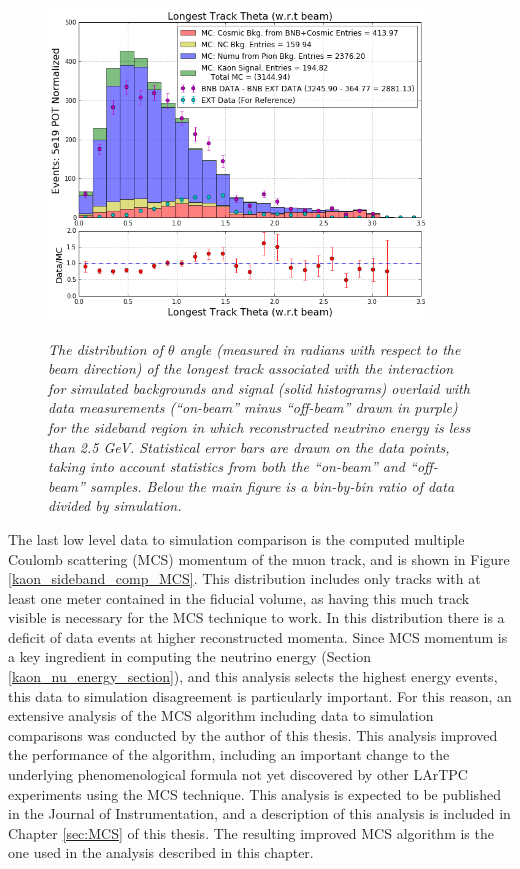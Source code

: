 \begin{figure}[ht!]
\centering
	\includegraphics[width=0.9\textwidth]{Figures/kaon_sideband_comp_theta.png} \\
\caption{\textit{The distribution of $\theta$ angle (measured in radians with respect to the beam direction) of the longest track associated with the interaction for simulated backgrounds and signal (solid histograms) overlaid with data measurements (``on-beam'' minus ``off-beam'' drawn in purple) for the sideband region in which reconstructed neutrino energy is less than 2.5 GeV. Statistical error bars are drawn on the data points, taking into account statistics from both the ``on-beam'' and ``off-beam'' samples. Below the main figure is a bin-by-bin ratio of data divided by simulation.}}\label{kaon_sideband_comp_theta}
\end{figure}

The last low level data to simulation comparison is the computed multiple Coulomb scattering (MCS) momentum of the muon track, and is shown in Figure \ref{kaon_sideband_comp_MCS}. This distribution includes only tracks with at least one meter contained in the fiducial volume, as having this much track visible is necessary for the MCS technique to work. In this distribution there is a deficit of data events at higher reconstructed momenta. Since MCS momentum is a key ingredient in computing the neutrino energy (Section \ref{kaon_nu_energy_section}), and this analysis selects the highest energy events, this data to simulation disagreement is particularly important. For this reason, an extensive analysis of the MCS algorithm including data to simulation comparisons was conducted by the author of this thesis. This analysis improved the performance of the algorithm, including an important change to the underlying phenomenological formula not yet discovered by other LArTPC experiments using the MCS technique. This analysis is expected to be published in the Journal of Instrumentation, and a description of this analysis is included in Chapter \ref{sec:MCS} of this thesis. The resulting improved MCS algorithm is the one used in the analysis described in this chapter.\\


